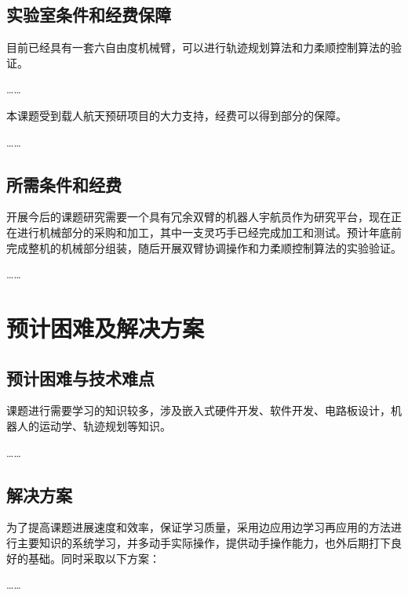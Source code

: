 \subsection{实验室条件和经费保障}

目前已经具有一套六自由度机械臂，可以进行轨迹规划算法和力柔顺控制算法的验证。

……

本课题受到载人航天预研项目的大力支持，经费可以得到部分的保障。

……

\hitenter

\subsection{所需条件和经费}

开展今后的课题研究需要一个具有冗余双臂的机器人宇航员作为研究平台，现在正在进行机械部分的采购和加工，其中一支灵巧手已经完成加工和测试。预计年底前完成整机的机械部分组装，随后开展双臂协调操作和力柔顺控制算法的实验验证。

……

\section{预计困难及解决方案}

\subsection{预计困难与技术难点}

课题进行需要学习的知识较多，涉及嵌入式硬件开发、软件开发、电路板设计，机器人的运动学、轨迹规划等知识。

……

\hitenter

\subsection{解决方案}

为了提高课题进展速度和效率，保证学习质量，采用边应用边学习再应用的方法进行主要知识的系统学习，并多动手实际操作，提供动手操作能力，也外后期打下良好的基础。同时采取以下方案：

……

\nocite{*}
